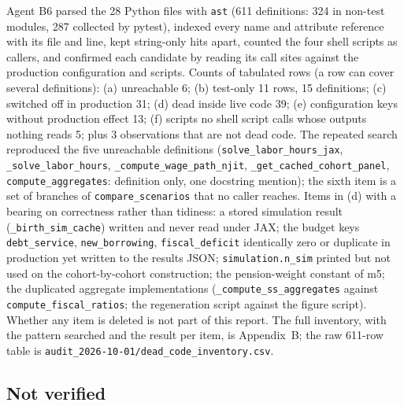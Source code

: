 \documentclass[11pt,a4paper]{article}
\newcommand{\code}[1]{\texttt{#1}}
\begin{document}
Agent B6 parsed the 28 Python files with \code{ast} (611 definitions: 324 in non-test modules, 287 collected by pytest), indexed every name and attribute reference with its file and line, kept string-only hits apart, counted the four shell scripts as callers, and confirmed each candidate by reading its call sites against the production configuration and scripts. Counts of tabulated rows (a row can cover several definitions): (a) unreachable 6; (b) test-only 11 rows, 15 definitions; (c) switched off in production 31; (d) dead inside live code 39; (e) configuration keys without production effect 13; (f) scripts no shell script calls whose outputs nothing reads 5; plus 3 observations that are not dead code. The repeated search reproduced the five unreachable definitions (\code{solve_labor_hours_jax}, \code{_solve_labor_hours}, \code{_compute_wage_path_njit}, \code{_get_cached_cohort_panel}, \code{compute_aggregates}: definition only, one docstring mention); the sixth item is a set of branches of \code{compare_scenarios} that no caller reaches. Items in (d) with a bearing on correctness rather than tidiness: a stored simulation result (\code{_birth_sim_cache}) written and never read under JAX; the budget keys \code{debt_service}, \code{new_borrowing}, \code{fiscal_deficit} identically zero or duplicate in production yet written to the results JSON; \code{simulation.n_sim} printed but not used on the cohort-by-cohort construction; the pension-weight constant of m5; the duplicated aggregate implementations (\code{_compute_ss_aggregates} against \code{compute_fiscal_ratios}; the regeneration script against the figure script). Whether any item is deleted is not part of this report. The full inventory, with the pattern searched and the result per item, is Appendix~B; the raw 611-row table is \code{audit_2026-10-01/dead_code_inventory.csv}.

\subsection{Not verified}
\end{document}

